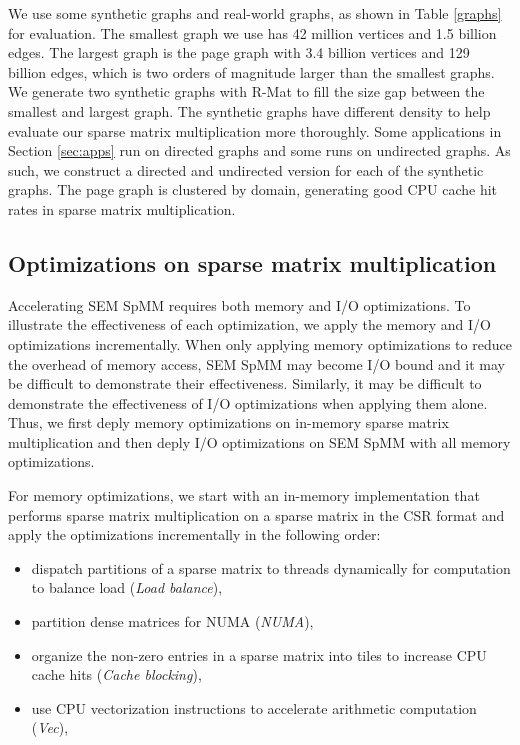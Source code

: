 We use some synthetic graphs and real-world graphs, as shown in Table \ref{graphs}
for evaluation. The smallest graph we use has 42 million vertices and 1.5 billion
edges. The largest graph is the page graph with 3.4 billion vertices
and 129 billion edges, which is two orders of magnitude larger than the smallest
graphs. We generate two synthetic graphs with R-Mat \cite{rmat} to fill
the size gap between the smallest and largest graph. The synthetic graphs
have different density to help evaluate our sparse matrix multiplication more
thoroughly. Some applications in Section \ref{sec:apps} run on directed graphs
and some runs on undirected graphs. As such, we construct a directed and
undirected version for each of the synthetic graphs. The page graph is clustered
by domain, generating good CPU cache hit rates in sparse matrix multiplication.

\subsection{Optimizations on sparse matrix multiplication}
Accelerating SEM SpMM requires both memory and I/O optimizations. To illustrate
the effectiveness of each optimization, we apply the memory and I/O optimizations
incrementally. When only applying memory optimizations to reduce the overhead
of memory access, SEM SpMM may become I/O bound and it may be difficult to
demonstrate their effectiveness. Similarly, it may be difficult to demonstrate
the effectiveness of I/O optimizations when applying them alone. Thus, we first
deply memory optimizations on in-memory sparse matrix multiplication and then
deply I/O optimizations on SEM SpMM with all memory optimizations.

For memory optimizations, we start with an in-memory implementation that
performs sparse matrix multiplication on a sparse matrix in the CSR format
and apply the optimizations incrementally in the following order:
\begin{itemize} \itemsep1pt \parskip0pt 
	\item dispatch partitions of a sparse matrix to threads dynamically for
		computation to balance load (\textit{Load balance}),
	\item partition dense matrices for NUMA (\textit{NUMA}),
	\item organize the non-zero entries in a sparse matrix into tiles to
		increase CPU cache hits (\textit{Cache blocking}),
	\item use CPU vectorization instructions to accelerate arithmetic
		computation (\textit{Vec}),
\end{itemize}

